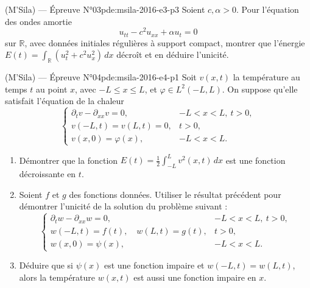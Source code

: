 \newpage
\begin{problem}{(M'Sila) — Épreuve N°03}{pde:msila-2016-e3-p3}
Soient $c,\alpha>0$. Pour l'équation des ondes amortie
$$u_{tt}-c^2u_{xx}+\alpha u_t=0$$
sur $\mathbb R$, avec données initiales régulières à support compact, montrer que l'énergie $E(t)=\int_{\mathbb R}(u_t^2+c^2u_x^2)\,dx$ décroît et en déduire l'unicité.
\end{problem}
\newpage
\begin{problem}{(M'Sila) — Épreuve N°04}{pde:msila-2016-e4-p1}
Soit $v(x,t)$ la température au temps $t$ au point $x$, avec $-L\leq x\leq L$, et $\varphi\in L^2(-L,L)$. On suppose qu'elle satisfait l'équation de la chaleur
$$\begin{cases}\partial_tv-\partial_{xx}v=0, & -L<x<L,\ t>0,\\ v(-L,t)=v(L,t)=0, & t>0,\\ v(x,0)=\varphi(x), & -L<x<L.\end{cases}$$
\begin{enumerate}\item Démontrer que la fonction $E(t)=\frac12\int_{-L}^{L}v^2(x,t)\,dx$ est une fonction décroissante en $t$.\item Soient $f$ et $g$ des fonctions données. Utiliser le résultat précédent pour démontrer l'unicité de la solution du problème suivant :
$$\begin{cases}\partial_tw-\partial_{xx}w=0, & -L<x<L,\ t>0,\\ w(-L,t)=f(t),\quad w(L,t)=g(t), & t>0,\\ w(x,0)=\psi(x), & -L<x<L.\end{cases}$$
\item Déduire que si $\psi(x)$ est une fonction impaire et $w(-L,t)=w(L,t)$, alors la température $w(x,t)$ est aussi une fonction impaire en $x$.\end{enumerate}
\end{problem}
\newpage
